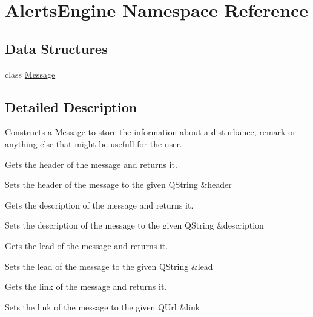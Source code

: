 \hypertarget{namespaceAlertsEngine}{}\section{Alerts\+Engine Namespace Reference}
\label{namespaceAlertsEngine}
\subsection*{Data Structures}
\begin{DoxyCompactItemize}
\item 
class \mbox{\hyperlink{classAlertsEngine_1_1Message}{Message}}
\end{DoxyCompactItemize}


\subsection{Detailed Description}
Constructs a \mbox{\hyperlink{classAlertsEngine_1_1Message}{Message}} to store the information about a disturbance, remark or anything else that might be usefull for the user.

Gets the header of the message and returns it.

Sets the header of the message to the given Q\+String \&header

Gets the description of the message and returns it.

Sets the description of the message to the given Q\+String \&description

Gets the lead of the message and returns it.

Sets the lead of the message to the given Q\+String \&lead

Gets the link of the message and returns it.

Sets the link of the message to the given Q\+Url \&link 